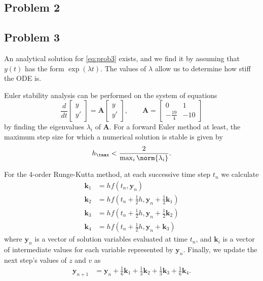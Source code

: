 \documentclass[12pt]{article}
\begin{document}
\subsection{Problem 2}

\subsection{Problem 3}

An analytical solution for \eqref{eq:prob3} exists, and we find it by assuming that $y(t)$ has the form $\exp(\lambda t)$. The values of $\lambda$ allow us to determine how stiff the ODE is.

Euler stability analysis can be performed on the system of equations
\begin{equation}
\frac{d}{dt}
\begin{bmatrix}
y \\
y'
\end{bmatrix}
=
\mathbf{A}
\begin{bmatrix}
y \\
y'
\end{bmatrix}
, \qquad
\mathbf{A}
=
\begin{bmatrix}
0 & 1 \\
-\frac{19}{4} & -10
\end{bmatrix}
\end{equation}
by finding the eigenvalues $\lambda_i$ of $\mathbf{A}$. For a forward Euler method at least, the maximum step size for which a numerical solution is stable is given by
\begin{equation}
h_\tmax < \frac{2}{\max_i\norm{\lambda_i}}
.
\end{equation}

For the 4\th-order Runge-Kutta method, at each successive time step $t_n$ we calculate
\begin{equation}
\begin{aligned}
\mathbf{k}_1 &= h f(t_n, \mathbf{y}_n)
\\
\mathbf{k}_2 &= h f(t_n + \tfrac{1}{2} h, \mathbf{y}_n + \tfrac{1}{2} \mathbf{k}_1)
\\
\mathbf{k}_3 &= h f(t_n + \tfrac{1}{2} h, \mathbf{y}_n + \tfrac{1}{2} \mathbf{k}_2)
\\
\mathbf{k}_4 &= h f(t_n + \tfrac{1}{2} h, \mathbf{y}_n + \mathbf{k}_3)
\end{aligned}
\end{equation}
where $\mathbf{y}_n$ is a vector of solution variables evaluated at time $t_n$, and $\mathbf{k}_i$ is a vector of intermediate values for each variable represented by $\mathbf{y}_n$. Finally, we update the next step's values of $z$ and $v$ as
\begin{equation}
\begin{aligned}
\mathbf{y}_{n+1} &= \mathbf{y}_n + \tfrac{1}{6} \mathbf{k}_1 + \tfrac{1}{3} \mathbf{k}_2 + \tfrac{1}{3} \mathbf{k}_3 + \tfrac{1}{6} \mathbf{k}_4
.
\end{aligned}
\end{equation}
\end{document}
